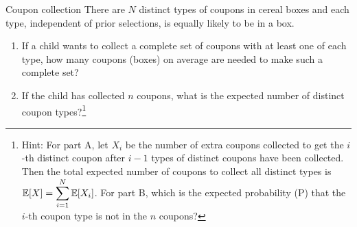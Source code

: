 \begin{problem}{Coupon collection}
There are $N$ distinct types of coupons in cereal boxes and each type, independent of
prior selections, is equally likely to be in a box.

\begin{enumerate}
\item[A.] If a child wants to collect a complete set of coupons with at least one of each
type, how many coupons (boxes) on average are needed to make such a complete set?
\item[B.] If the child has collected $n$ coupons, what is the expected number of distinct
coupon types?\footnote[31]{Hint: For part A, let $X_i$ be the number of extra coupons collected
to get the $i$-th distinct coupon after $i-1$ types of distinct coupons have been collected.
Then the total expected number of coupons to collect all distinct types is
$\mathbb{E}[X]=\displaystyle\sum_{i=1}^{N}\mathbb{E}[X_i]$. For part B, which is the expected probability
(P) that the $i$-th coupon type is not in the $n$ coupons?}
\end{enumerate}

\end{problem}
